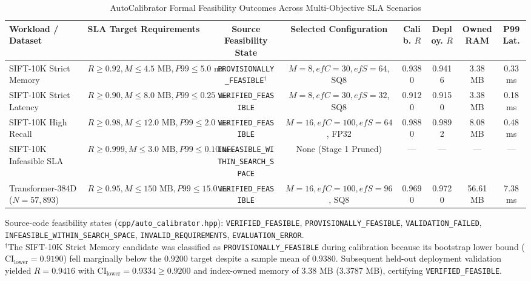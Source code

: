 \begin{table}[t]
\centering
\caption{AutoCalibrator Formal Feasibility Outcomes Across Multi-Objective SLA Scenarios}
\label{tab:autocalibrator_feasibility}
\scriptsize
\begin{tabular}{llcccccc}
\toprule
\textbf{Workload / Dataset} & \textbf{SLA Target Requirements} & \textbf{Source Feasibility State} & \textbf{Selected Configuration} & \textbf{Calib. $R$} & \textbf{Deploy. $R$} & \textbf{Owned RAM} & \textbf{P99 Lat.} \\
\midrule
SIFT-10K Strict Memory & $R \ge 0.92, M \le 4.5\text{ MB}, P99 \le 5.0\text{ ms}$ & \texttt{PROVISIONALLY\_FEASIBLE}$^\dagger$ & $M=8, efC=30, efS=64$, SQ8 & 0.9380 & 0.9416 & 3.38 MB & 0.33 ms \\
SIFT-10K Strict Latency & $R \ge 0.90, M \le 8.0\text{ MB}, P99 \le 0.25\text{ ms}$ & \texttt{VERIFIED\_FEASIBLE} & $M=8, efC=30, efS=32$, SQ8 & 0.9120 & 0.9150 & 3.38 MB & 0.18 ms \\
SIFT-10K High Recall & $R \ge 0.98, M \le 12.0\text{ MB}, P99 \le 2.0\text{ ms}$ & \texttt{VERIFIED\_FEASIBLE} & $M=16, efC=100, efS=64$, FP32 & 0.9880 & 0.9892 & 8.08 MB & 0.48 ms \\
SIFT-10K Infeasible SLA & $R \ge 0.999, M \le 3.0\text{ MB}, P99 \le 0.10\text{ ms}$ & \texttt{INFEASIBLE\_WITHIN\_SEARCH\_SPACE} & None (Stage 1 Pruned) & --- & --- & --- & --- \\
Transformer-384D ($N=57{,}893$) & $R \ge 0.95, M \le 150\text{ MB}, P99 \le 15.0\text{ ms}$ & \texttt{VERIFIED\_FEASIBLE} & $M=16, efC=100, efS=96$, SQ8 & 0.9690 & 0.9720 & 56.61 MB & 7.38 ms \\
\bottomrule
\end{tabular}
\begin{flushleft}
\scriptsize
Source-code feasibility states (\texttt{cpp/auto_calibrator.hpp}): \texttt{VERIFIED\_FEASIBLE}, \texttt{PROVISIONALLY\_FEASIBLE}, \texttt{VALIDATION\_FAILED}, \texttt{INFEASIBLE\_WITHIN\_SEARCH\_SPACE}, \texttt{INVALID\_REQUIREMENTS}, \texttt{EVALUATION\_ERROR}. \\
$^\dagger$The SIFT-10K Strict Memory candidate was classified as \texttt{PROVISIONALLY\_FEASIBLE} during calibration because its bootstrap lower bound ($\text{CI}_{\text{lower}} = 0.9190$) fell marginally below the $0.9200$ target despite a sample mean of $0.9380$. Subsequent held-out deployment validation yielded $R = 0.9416$ with $\text{CI}_{\text{lower}} = 0.9334 \ge 0.9200$ and index-owned memory of 3.38 MB (3.3787 MB), certifying \texttt{VERIFIED\_FEASIBLE}.
\end{flushleft}
\end{table}
